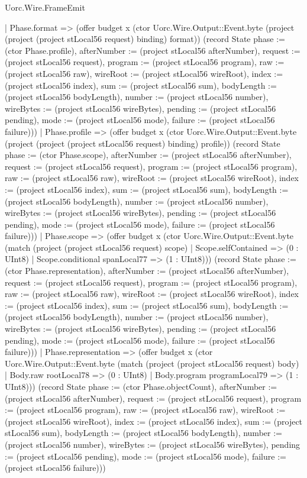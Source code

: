 \begin{lexlean}{Uorc.Wire.FrameEmit}
\begin{semanticmodule}
{        | Phase.format => (offer budget x (ctor Uorc.Wire.Output::Event.byte (project (project (project stLocal56 request) binding) format)) (record State {phase := (ctor Phase.profile), afterNumber := (project stLocal56 afterNumber), request := (project stLocal56 request), program := (project stLocal56 program), raw := (project stLocal56 raw), wireRoot := (project stLocal56 wireRoot), index := (project stLocal56 index), sum := (project stLocal56 sum), bodyLength := (project stLocal56 bodyLength), number := (project stLocal56 number), wireBytes := (project stLocal56 wireBytes), pending := (project stLocal56 pending), mode := (project stLocal56 mode), failure := (project stLocal56 failure)}))
        | Phase.profile => (offer budget x (ctor Uorc.Wire.Output::Event.byte (project (project (project stLocal56 request) binding) profile)) (record State {phase := (ctor Phase.scope), afterNumber := (project stLocal56 afterNumber), request := (project stLocal56 request), program := (project stLocal56 program), raw := (project stLocal56 raw), wireRoot := (project stLocal56 wireRoot), index := (project stLocal56 index), sum := (project stLocal56 sum), bodyLength := (project stLocal56 bodyLength), number := (project stLocal56 number), wireBytes := (project stLocal56 wireBytes), pending := (project stLocal56 pending), mode := (project stLocal56 mode), failure := (project stLocal56 failure)}))
        | Phase.scope => (offer budget x (ctor Uorc.Wire.Output::Event.byte (match (project (project stLocal56 request) scope)
          | Scope.selfContained => (0 : UInt8)
          | Scope.conditional spanLocal77 => (1 : UInt8))) (record State {phase := (ctor Phase.representation), afterNumber := (project stLocal56 afterNumber), request := (project stLocal56 request), program := (project stLocal56 program), raw := (project stLocal56 raw), wireRoot := (project stLocal56 wireRoot), index := (project stLocal56 index), sum := (project stLocal56 sum), bodyLength := (project stLocal56 bodyLength), number := (project stLocal56 number), wireBytes := (project stLocal56 wireBytes), pending := (project stLocal56 pending), mode := (project stLocal56 mode), failure := (project stLocal56 failure)}))
        | Phase.representation => (offer budget x (ctor Uorc.Wire.Output::Event.byte (match (project (project stLocal56 request) body)
          | Body.raw rootLocal78 => (0 : UInt8)
          | Body.program programLocal79 => (1 : UInt8))) (record State {phase := (ctor Phase.objectCount), afterNumber := (project stLocal56 afterNumber), request := (project stLocal56 request), program := (project stLocal56 program), raw := (project stLocal56 raw), wireRoot := (project stLocal56 wireRoot), index := (project stLocal56 index), sum := (project stLocal56 sum), bodyLength := (project stLocal56 bodyLength), number := (project stLocal56 number), wireBytes := (project stLocal56 wireBytes), pending := (project stLocal56 pending), mode := (project stLocal56 mode), failure := (project stLocal56 failure)}))
}
\end{semanticmodule}
\end{lexlean}

